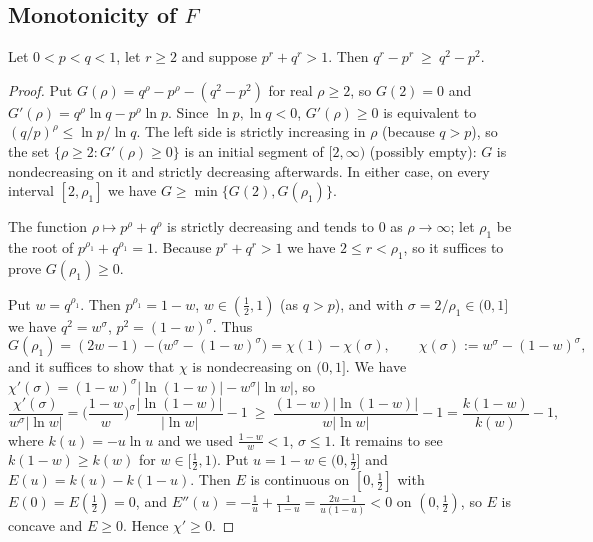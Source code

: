 \subsection{Monotonicity of $F$}
\begin{lemma}\label{lem:ineq}
Let $0<p<q<1$, let $r\ge2$ and suppose $p^r+q^r>1$. Then $q^r-p^r\ \ge\ q^2-p^2$.
\end{lemma}
\begin{proof}
Put $G(\rho)=q^\rho-p^\rho-(q^2-p^2)$ for real $\rho\ge2$, so $G(2)=0$ and $G'(\rho)=q^\rho\ln q-p^\rho\ln p$. Since $\ln p,\ln q<0$, $G'(\rho)\ge0$ is equivalent to $(q/p)^\rho\le \ln p/\ln q$. The left side is strictly increasing in $\rho$ (because $q>p$), so the set $\{\rho\ge2:G'(\rho)\ge0\}$ is an initial segment of $[2,\infty)$ (possibly empty): $G$ is nondecreasing on it and strictly decreasing afterwards. In either case, on every interval $[2,\rho_1]$ we have $G\ge\min\{G(2),G(\rho_1)\}$.

The function $\rho\mapsto p^\rho+q^\rho$ is strictly decreasing and tends to $0$ as $\rho\to\infty$; let $\rho_1$ be the root of $p^{\rho_1}+q^{\rho_1}=1$. Because $p^r+q^r>1$ we have $2\le r<\rho_1$, so it suffices to prove $G(\rho_1)\ge0$.

Put $w=q^{\rho_1}$. Then $p^{\rho_1}=1-w$, $w\in(\tfrac12,1)$ (as $q>p$), and with $\sigma=2/\rho_1\in(0,1]$ we have $q^2=w^\sigma$, $p^2=(1-w)^\sigma$. Thus
\[
G(\rho_1)=(2w-1)-\big(w^\sigma-(1-w)^\sigma\big)=\chi(1)-\chi(\sigma),\qquad \chi(\sigma):=w^\sigma-(1-w)^\sigma ,
\]
and it suffices to show that $\chi$ is nondecreasing on $(0,1]$. We have $\chi'(\sigma)=(1-w)^\sigma|\ln(1-w)|-w^\sigma|\ln w|$, so
\[
\frac{\chi'(\sigma)}{w^\sigma|\ln w|}=\Big(\frac{1-w}{w}\Big)^{\sigma}\frac{|\ln(1-w)|}{|\ln w|}-1\ \ge\ \frac{(1-w)|\ln(1-w)|}{w|\ln w|}-1=\frac{k(1-w)}{k(w)}-1,
\]
where $k(u)=-u\ln u$ and we used $\frac{1-w}{w}<1$, $\sigma\le1$. It remains to see $k(1-w)\ge k(w)$ for $w\in[\tfrac12,1)$. Put $u=1-w\in(0,\tfrac12]$ and $E(u)=k(u)-k(1-u)$. Then $E$ is continuous on $[0,\tfrac12]$ with $E(0)=E(\tfrac12)=0$, and $E''(u)=-\frac1u+\frac1{1-u}=\frac{2u-1}{u(1-u)}<0$ on $(0,\tfrac12)$, so $E$ is concave and $E\ge0$. Hence $\chi'\ge0$.
\end{proof}

